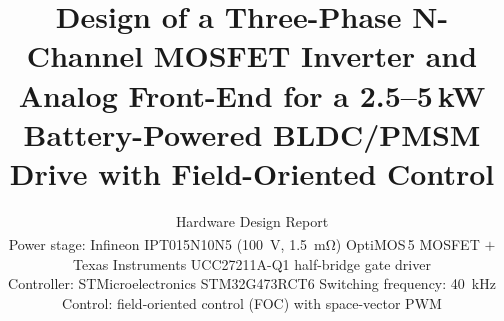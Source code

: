 \documentclass[journal,onecolumn,11pt]{IEEEtran}
\begin{document}
\title{Design of a Three-Phase N-Channel MOSFET Inverter and Analog Front-End
for a \mbox{2.5--5\,kW} Battery-Powered BLDC/PMSM Drive with Field-Oriented Control}

\author{Hardware Design Report\\[2pt]
\small Power stage: Infineon IPT015N10N5 (\SI{100}{\volt}, \SI{1.5}{\milli\ohm})
OptiMOS\textsuperscript{\texttrademark}\,5 MOSFET $+$ Texas Instruments UCC27211A-Q1 half-bridge gate driver\\
\small Controller: STMicroelectronics STM32G473RCT6 \quad
Switching frequency: \SI{40}{\kilo\hertz} \quad Control: field-oriented control (FOC) with space-vector PWM}

\maketitle
\end{document}
